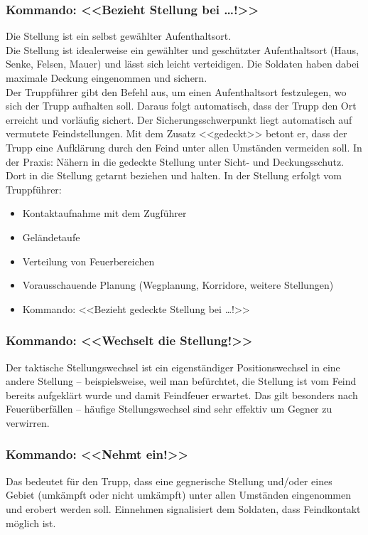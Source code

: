 \subsubsection{Kommando: <<Bezieht Stellung bei …!>>}
	Die Stellung ist ein selbst gewählter Aufenthaltsort. \\
	Die Stellung ist idealerweise ein gewählter und geschützter Aufenthaltsort (Haus, Senke, Felsen, Mauer) und lässt sich leicht verteidigen. Die Soldaten haben dabei maximale Deckung eingenommen und sichern. \\
	Der Truppführer gibt den Befehl aus, um einen Aufenthaltsort festzulegen, wo sich der Trupp aufhalten soll. Daraus folgt automatisch, dass der Trupp den Ort erreicht und vorläufig sichert. Der Sicherungsschwerpunkt liegt automatisch auf vermutete Feindstellungen. Mit dem Zusatz <<gedeckt>> betont er, dass der 		Trupp eine Aufklärung durch den Feind unter allen Umständen vermeiden soll. In der Praxis: Nähern in die gedeckte Stellung unter Sicht- und Deckungsschutz. Dort in die Stellung getarnt beziehen und halten. In der Stellung erfolgt vom Truppführer:
		\begin{itemize}
			\item Kontaktaufnahme mit dem Zugführer 
			\item Geländetaufe 
			\item Verteilung von Feuerbereichen 
			\item Vorausschauende Planung (Wegplanung, Korridore, weitere Stellungen) 
			\item Kommando: <<Bezieht gedeckte Stellung bei …!>> 
		\end{itemize}

\subsubsection{Kommando: <<Wechselt die Stellung!>>}
	Der taktische Stellungswechsel ist ein eigenständiger Positionswechsel in eine andere Stellung – beispielsweise, weil man befürchtet, die Stellung ist vom Feind bereits aufgeklärt wurde und damit Feindfeuer erwartet. Das gilt besonders nach Feuerüberfällen – häufige Stellungswechsel sind sehr effektiv um Gegner zu verwirren.

\subsubsection{Kommando: <<Nehmt ein!>>}
	Das bedeutet für den Trupp, dass eine gegnerische Stellung und/oder eines Gebiet (umkämpft oder nicht umkämpft) unter allen Umständen eingenommen und erobert werden soll. Einnehmen signalisiert dem Soldaten, dass Feindkontakt möglich ist.

